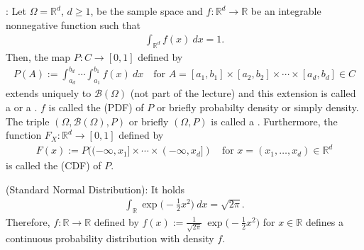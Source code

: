 \documentclass[letterpaper,10pt,english]{jupyterBook}
\begin{document}
\sphinxAtStartPar
{}: Let \(\Omega = \mathbb{R}^d\), \(d \ge 1\), be the sample space and \(f: \mathbb{R}^d \rightarrow \mathbb{R}\) be an integrable non\sphinxhyphen{}negative function such that
\begin{equation*}
\begin{split} \int_{\mathbb{R}^d} f(x)~dx = 1. \end{split}
\end{equation*}
\sphinxAtStartPar
Then, the map \(P: C \rightarrow [0, 1]\) defined by
\begin{equation*}
\begin{split} P(A) := \int_{a_d}^{b_d} \cdots \int_{a_1}^{b_1} f(x) ~ dx \quad \text{for } A = [a_1, b_1] \times [a_2, b_2] \times \cdots \times [a_d, b_d] \in C\end{split}
\end{equation*}
\sphinxAtStartPar
extends uniquely to \(\mathcal{B}(\Omega)\) (not part of the lecture) and this extension is called a  or a . \(f\) is called the  (PDF) of \(P\) or briefly probabilty density or simply density. The triple \((\Omega, \mathcal{B}(\Omega), P)\) or briefly \((\Omega, P)\) is called a . Furthermore, the function \(F_X: \mathbb{R}^d \rightarrow [0, 1]\) defined by
\begin{equation*}
\begin{split} F(x) := P((-\infty, x_1] \times \cdots \times (-\infty, x_d]) \quad \text{for } x=(x_1, \dots, x_d) \in \mathbb{R}^d\end{split}
\end{equation*}
\sphinxAtStartPar
is called the  (CDF) of \(P\).

\sphinxAtStartPar
{} (Standard Normal Distribution): It holds
\begin{equation*}
\begin{split} \int_{\mathbb{R}} \exp\big(-\frac{1}{2} x^2\big)~dx = \sqrt{2 \pi}.\end{split}
\end{equation*}
\sphinxAtStartPar
Therefore, \(f: \mathbb{R} \rightarrow \mathbb{R}\) defined by \(f(x):= \frac{1}{\sqrt{2 \pi}}~\exp\big(-\frac{1}{2} x^2\big)\) for \(x \in \mathbb{R}\) defines a continuous probability distribution with density \(f\).
\end{document}
